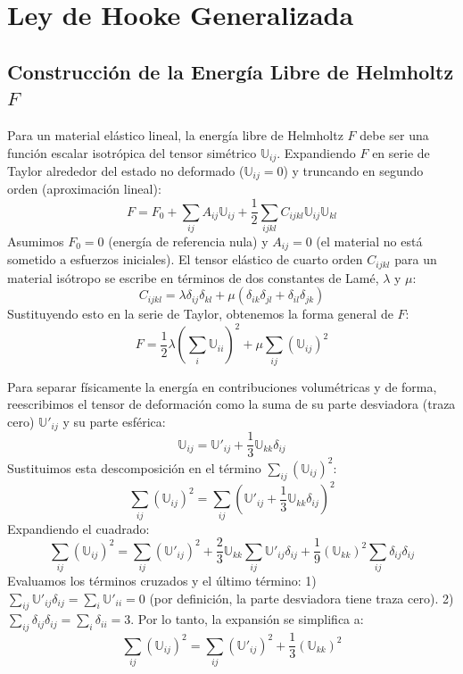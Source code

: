 \section{Ley de Hooke Generalizada}

\subsection{Construcción de la Energía Libre de Helmholtz \texorpdfstring{$F$}{F}}

Para un material elástico lineal, la energía libre de Helmholtz $F$ debe ser una función escalar isotrópica del tensor simétrico $\mathbb{U}_{ij}$. Expandiendo $F$ en serie de Taylor alrededor del estado no deformado ($\mathbb{U}_{ij} = 0$) y truncando en segundo orden (aproximación lineal):
$$ F = F_0 + \sum_{ij} A_{ij} \mathbb{U}_{ij} + \frac{1}{2} \sum_{ijkl} C_{ijkl} \mathbb{U}_{ij} \mathbb{U}_{kl} $$
Asumimos $F_0 = 0$ (energía de referencia nula) y $A_{ij} = 0$ (el material no está sometido a esfuerzos iniciales). El tensor elástico de cuarto orden $C_{ijkl}$ para un material isótropo se escribe en términos de dos constantes de Lamé, $\lambda$ y $\mu$:
$$ C_{ijkl} = \lambda \delta_{ij} \delta_{kl} + \mu (\delta_{ik} \delta_{jl} + \delta_{il} \delta_{jk}) $$
Sustituyendo esto en la serie de Taylor, obtenemos la forma general de $F$:
$$ F = \frac{1}{2} \lambda \left( \sum_i \mathbb{U}_{ii} \right)^2 + \mu \sum_{ij} (\mathbb{U}_{ij})^2 $$

Para separar físicamente la energía en contribuciones volumétricas y de forma, reescribimos el tensor de deformación como la suma de su parte desviadora (traza cero) $\mathbb{U}'_{ij}$ y su parte esférica:
$$ \mathbb{U}_{ij} = \mathbb{U}'_{ij} + \frac{1}{3} \mathbb{U}_{kk} \delta_{ij} $$
Sustituimos esta descomposición en el término $\sum_{ij} (\mathbb{U}_{ij})^2$:
$$ \sum_{ij} (\mathbb{U}_{ij})^2 = \sum_{ij} \left( \mathbb{U}'_{ij} + \frac{1}{3} \mathbb{U}_{kk} \delta_{ij} \right)^2 $$
Expandiendo el cuadrado:
$$ \sum_{ij} (\mathbb{U}_{ij})^2 = \sum_{ij} (\mathbb{U}'_{ij})^2 + \frac{2}{3} \mathbb{U}_{kk} \sum_{ij} \mathbb{U}'_{ij} \delta_{ij} + \frac{1}{9} (\mathbb{U}_{kk})^2 \sum_{ij} \delta_{ij} \delta_{ij} $$
Evaluamos los términos cruzados y el último término:
1) $\sum_{ij} \mathbb{U}'_{ij} \delta_{ij} = \sum_i \mathbb{U}'_{ii} = 0$ (por definición, la parte desviadora tiene traza cero).
2) $\sum_{ij} \delta_{ij} \delta_{ij} = \sum_i \delta_{ii} = 3$.
Por lo tanto, la expansión se simplifica a:
$$ \sum_{ij} (\mathbb{U}_{ij})^2 = \sum_{ij} (\mathbb{U}'_{ij})^2 + \frac{1}{3} (\mathbb{U}_{kk})^2 $$

